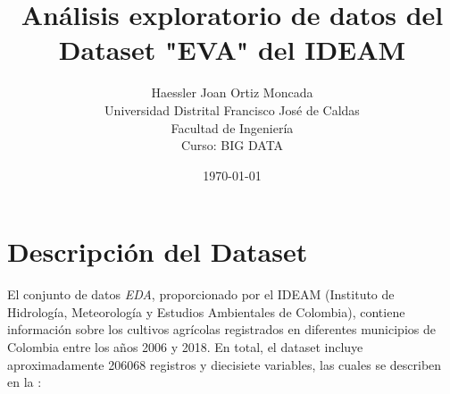 \documentclass[12pt,a4paper]{article}
\title{\textbf{Análisis exploratorio de datos del Dataset "EVA" del IDEAM}}
\author{Haessler Joan Ortiz Moncada \\[0.5cm]
        Universidad Distrital Francisco José de Caldas \\
        Facultad de Ingeniería \\
        Curso: BIG DATA}
\date{\today}
\begin{document}
\maketitle

\section{Descripción del Dataset}
El conjunto de datos \textit{EDA}, proporcionado por el IDEAM (Instituto de Hidrología, Meteorología y Estudios Ambientales de Colombia), 
contiene información sobre los cultivos agrícolas registrados en diferentes municipios de Colombia entre los años 2006 y 2018. 
En total, el dataset incluye aproximadamente 206068 registros y diecisiete variables, las cuales se describen en la :
\end{document}
